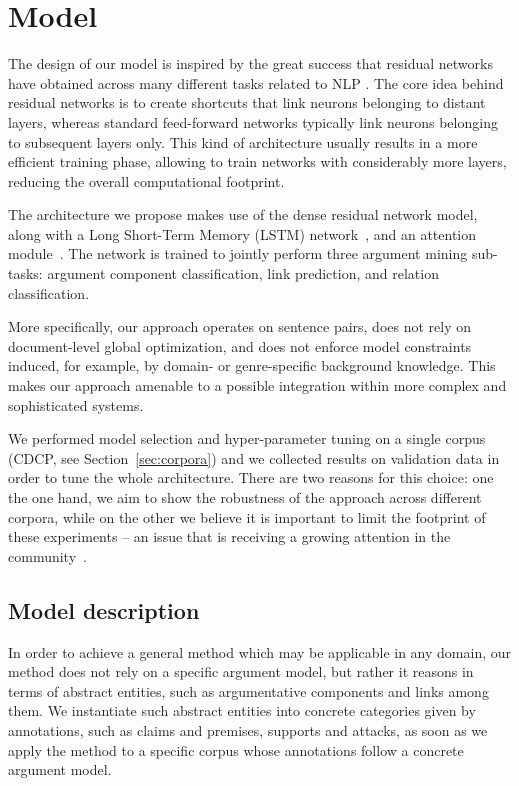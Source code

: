 \documentclass[journal]{IEEEtran}
\begin{document}
\section{Model}
\label{sec:model}
The design of our model is inspired by the great success that residual networks~\cite{He2016} have obtained across many different tasks related to NLP \cite{NIPS2017_7181,conneau2017very,huang2017deep}.
The core idea behind residual networks is to create shortcuts that link neurons belonging to distant layers, whereas standard feed-forward networks typically link neurons belonging to subsequent layers only. This kind of architecture usually results in a more efficient training phase, allowing to train networks with considerably more layers, reducing the overall computational footprint.

The architecture we propose makes use of the dense residual network model, along with a Long Short-Term Memory (LSTM) network~\cite{hochreiter1997long}, and an attention module~\cite{attention-survey}. The network is trained to jointly perform three argument mining sub-tasks: argument component classification, link prediction, and relation classification.

More specifically, our approach operates on sentence pairs, does not rely on document-level global optimization, and does not enforce model constraints induced, for example, by domain- or genre-specific background knowledge. This makes our approach amenable to a possible integration within more complex and sophisticated systems.

We performed model selection and hyper-parameter tuning on a single corpus (CDCP, see Section~\ref{sec:corpora}) and we collected results on validation data in order to tune the whole architecture. There are two reasons for this choice: one the one hand, we aim to show the robustness of the approach across different corpora, while on the other we believe it is important to limit the footprint of these experiments -- an issue that is receiving a growing attention in the community~\cite{NLPenergy}.

\subsection{Model description}

In order to achieve a general method which may be applicable in any domain, our method does not rely on a specific argument model, but rather it reasons in terms of abstract entities, such as argumentative components and links among them.
We instantiate such abstract entities into concrete categories given by annotations, such as claims and premises, supports and attacks, as soon as we apply the method to a specific corpus  whose annotations follow a concrete argument model.
\end{document}
